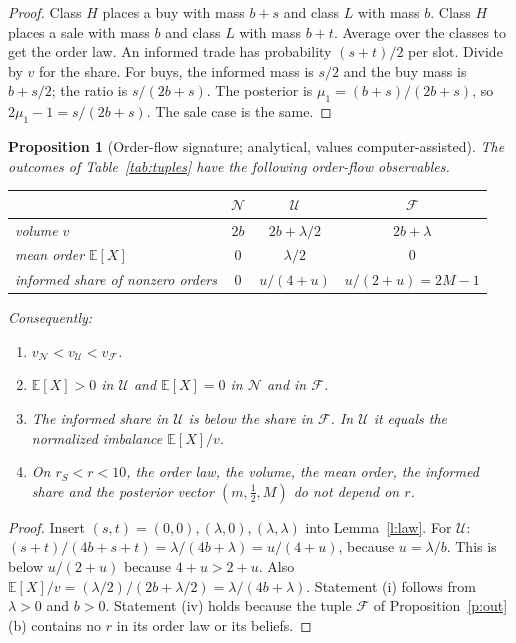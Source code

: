 \documentclass[12pt]{article}
\newtheorem{proposition}{Proposition}
\theoremstyle{definition}
\newcommand{\E}{\mathbb E}
\begin{document}
\begin{proof}
Class $H$ places a buy with mass $b+s$ and class $L$ with mass $b$.
Class $H$ places a sale with mass $b$ and class $L$ with mass $b+t$.
Average over the classes to get the order law.
An informed trade has probability $(s+t)/2$ per slot.
Divide by $v$ for the share.
For buys, the informed mass is $s/2$ and the buy mass is $b+s/2$; the ratio is $s/(2b+s)$.
The posterior is $\mu_1=(b+s)/(2b+s)$, so $2\mu_1-1=s/(2b+s)$.
The sale case is the same.
\end{proof}

\begin{proposition}[Order-flow signature; analytical, values computer-assisted]\label{p:flow}
The outcomes of Table~\ref{tab:tuples} have the following order-flow observables.
\begin{center}\small
\begin{tabular}{@{}lccc@{}}
\toprule
& $\mathcal N$ & $\mathcal U$ & $\mathcal F$\\
\midrule
volume $v$ & $2b$ & $2b+\lambda/2$ & $2b+\lambda$\\
mean order $\E[X]$ & $0$ & $\lambda/2$ & $0$\\
informed share of nonzero orders & $0$ & $u/(4+u)$ & $u/(2+u)=2M-1$\\
\bottomrule
\end{tabular}
\end{center}
Consequently:
\begin{enumerate}[label=(\roman*)]
\item $v_{\mathcal N}<v_{\mathcal U}<v_{\mathcal F}$.
\item $\E[X]>0$ in $\mathcal U$ and $\E[X]=0$ in $\mathcal N$ and in $\mathcal F$.
\item The informed share in $\mathcal U$ is below the share in $\mathcal F$.
In $\mathcal U$ it equals the normalized imbalance $\E[X]/v$.
\item On $r_S<r<10$, the order law, the volume, the mean order, the informed share and the posterior vector $(m,\tfrac12,M)$ do not depend on $r$.
\end{enumerate}
\end{proposition}

\begin{proof}
Insert $(s,t)=(0,0),(\lambda,0),(\lambda,\lambda)$ into Lemma~\ref{l:law}.
For $\mathcal U$: $(s+t)/(4b+s+t)=\lambda/(4b+\lambda)=u/(4+u)$, because $u=\lambda/b$.
This is below $u/(2+u)$ because $4+u>2+u$.
Also $\E[X]/v=(\lambda/2)/(2b+\lambda/2)=\lambda/(4b+\lambda)$.
Statement (i) follows from $\lambda>0$ and $b>0$.
Statement (iv) holds because the tuple $\mathcal F$ of Proposition~\ref{p:out}(b) contains no $r$ in its order law or its beliefs.
\end{proof}
\end{document}
